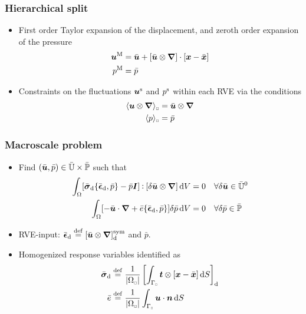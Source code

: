 \documentclass[11pt]{beamer} %
\DeclarePairedDelimiter{\homgen}{\langle}{\rangle_\rve}
\renewcommand{\dev}{\mathrm{d}}
\newcommand{\volume}{|\Omega_\rve|}
\newcommand{\rve}{
  {\mathchoice
   {\mbox{\scalebox{0.67}{$\Box$}}}
   {\mbox{\scalebox{0.67}{$\Box$}}}
   {\mbox{\scalebox{0.5}{$\Box$}}}
   {\mbox{\scalebox{0.375}{$\Box$}}}
  }
}
\begin{document}
\begin{frame}
 \frametitle{Hierarchical split}
\begin{itemize}
 \item First order Taylor expansion of the displacement, and zeroth order expansion of the pressure
\begin{align*}
 \boldsymbol{u}^{\mathrm{M}} &= \bar{\boldsymbol{u}} + [\bar{\boldsymbol{u}}\mathbin{\otimes}\boldsymbol{\nabla}]\cdot[\boldsymbol{x} - \bar{\boldsymbol{x}}]
\\
 p^{\mathrm{M}} &= \bar{p}
\end{align*}
 \item Constraints on the fluctuations $\boldsymbol{u}^{\mathrm{s}}$ and $p^{\mathrm{s}}$ within each RVE via the conditions
\begin{align*}
 \homgen{\ta u\outerp\diff} &= \bar{\ta u}\outerp\diff
\\
 \homgen{p} &= \bar{p}
\end{align*}
\end{itemize}
\end{frame}

\begin{frame}
 \frametitle{Macroscale problem}
\begin{itemize}
 \item Find $(\bar{\boldsymbol{u}}, \bar{p}) \in \bar{\mathbb{U}}\times \bar{\mathbb{P}}$ such that
 \begin{align*}
  \int_\Omega [{\bar{\ts\sigma}_\dev\{\bar{\ts\epsilon}_\dev, \bar{p}\}} - \bar{p}\ts I]\dprod[\delta\bar{\ta u}\outerp\diff]\dif V &= 0\quad \forall \delta\bar{\ta u} \in \bar{\set{U}}^0
\\
  \int_\Omega [-\bar{\ta u}\cdot\diff + {\bar{e}\{\bar{\ts\epsilon}_\dev, \bar{p}\}}]\delta\bar{p}\dif V &= 0\quad \forall \delta\bar{p} \in \bar{\set{P}}
 \end{align*}
 \item RVE-input: $\bar{\ts\epsilon}_\dev\defeq [\bar{\ta u}\outerp\diff]^\sym_\dev$ and $\bar{p}$.
 \item Homogenized response variables identified as
 \begin{align*}
 \bar{\ts\sigma}_\dev &\defeq \frac{1}{\volume} \left[\int_{\Gamma_\rve} \ta t \outerp [\ta x-\bar{\ta x}]\dif S\right]_\dev
\\
 \bar{e} &\defeq \frac{1}{\volume} \int_{\Gamma_\rve} \ta u \cdot \ta n\dif S
 \end{align*}
\end{itemize}
\end{frame}
\end{document}
